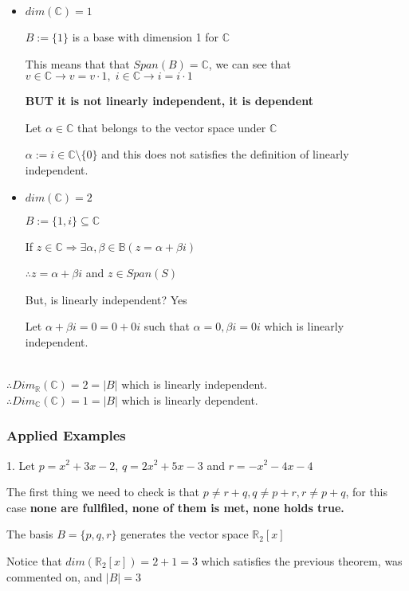 \documentclass{article}
\begin{document}
\begin{itemize}
    \item \(dim(\mathbb{C}) = 1\)

    \(B := \{1\}\) is a base with dimension 1 for \(\mathbb{C}\)

    This means that that \(Span(B) = \mathbb{C}\), we can see that \(v \in \mathbb{C} \rightarrow v = v\cdot 1,\; i \in \mathbb{C} \rightarrow i = i\cdot 1\)

    \textbf{BUT it is not linearly independent, it is dependent}

    Let \(\alpha \in \mathbb{C}\) that belongs to the vector space under \(\mathbb{C}\)

    \(\alpha := i \in \mathbb{C}\text{\textbackslash} \{0\}\) and this does not satisfies the definition of linearly independent.
    \item \(dim(\mathbb{C}) = 2\)

    \(B := \{1, i\} \subseteq \mathbb{C}\)

    If \(z \in \mathbb{C} \Rightarrow \exists \alpha, \beta \in \mathbb{B} (z = \alpha + \beta i)\)

    \(\therefore z = \alpha + \beta i \) and \(z \in Span(S)\)

    But, is linearly independent? Yes

    Let \( \alpha + \beta i = 0 = 0 + 0i\) such that \(\alpha = 0, \beta i = 0i\) which is linearly independent.
\end{itemize}
\\
\(\therefore Dim_\mathbb{R} (\mathbb{C}) = 2 = |B|\) which is linearly independent.
\\
\(\therefore Dim_\mathbb{C} (\mathbb{C}) = 1 = |B|\) which is linearly dependent.
\subsubsection*{Applied Examples}

1. Let \(p = x^2 + 3x - 2\), \(q = 2x^2 + 5x - 3\) and \(r = -x^2 -4x-4\)

The first thing we need to check is that \(p \neq r+q, q \neq p+r, r \neq p+q\), for this case \textbf{none are fullfiled, none of them is met, none holds true.}

The basis \(B = \{ p,q,r \}\) generates the vector space \(\mathbb{R}_2[x]\)

Notice that \(dim(\mathbb{R}_2[x]) = 2+1 = 3\) which satisfies the previous theorem, was commented on, and \(|B| = 3\)
\end{document}
